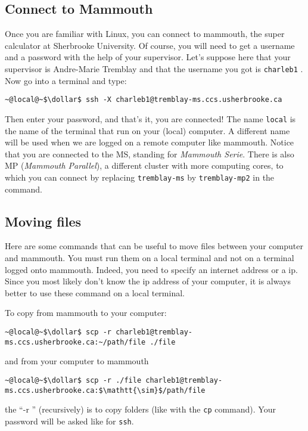 \documentclass[10pt,letter]{article}
\newcommand{\dollar}{\mbox{\textdollar}}
\begin{document}
\subsection{Connect to Mammouth}
Once you are familiar with Linux, you can connect to mammouth, the super calculator at Sherbrooke University. 
Of course, you will need to get a username and a password with the help of your supervisor.
Let's suppose here that your supervisor is Andre-Marie Tremblay and that the username you got is \texttt{charleb1} .
Now go into a terminal and type:
\begin{bashInput}
\begin{lstlisting}[style=BashInputStyle]
~@local@~$\dollar$ ssh -X charleb1@tremblay-ms.ccs.usherbrooke.ca
\end{lstlisting}   
\end{bashInput}

Then enter your password, and that's it, you are connected! 
The name \texttt{local}  is the name of the terminal that run on your (local) computer.
A different name will be used when we are logged on a remote computer like mammouth.
Notice that you are connected to the MS, standing for \emph{Mammouth Serie}. 
There is also MP (\emph{Mammouth Parallel}), a different cluster with more computing cores, 
to which you can connect by replacing \texttt{tremblay-ms}  by \texttt{tremblay-mp2}  in the command.

\subsection{Moving files}
Here are some commands that can be useful to move files between your computer and mammouth. 
You must run them on a local terminal and not on a terminal logged onto mammouth.
Indeed, you need to specify an internet address or a ip.
Since you most likely don't know the ip address of your computer, 
it is always better to use these command on a local terminal.

To copy from mammouth to your computer:
\begin{bashInput}
\begin{lstlisting}[style=BashInputStyle]
~@local@~$\dollar$ scp -r charleb1@tremblay-ms.ccs.usherbrooke.ca:~/path/file ./file
\end{lstlisting}
\end{bashInput}
and from your computer to mammouth
\begin{bashInput}
\begin{lstlisting}[style=BashInputStyle]
~@local@~$\dollar$ scp -r ./file charleb1@tremblay-ms.ccs.usherbrooke.ca:$\mathtt{\sim}$/path/file
\end{lstlisting}
\end{bashInput}
the ``-r '' (recursively) is to copy folders (like with the \texttt{cp} command). 
Your password will be asked like for \texttt{ssh}.%
\end{document}
